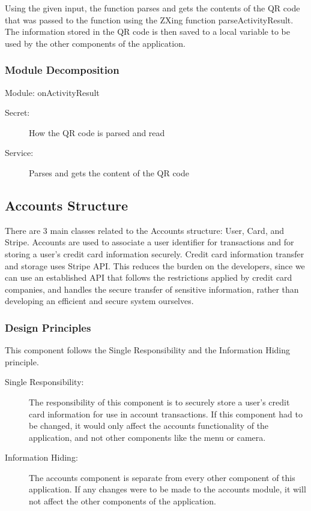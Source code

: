 \documentclass[12pt, titlepage]{article}
\begin{document}
Using the given input, the function parses and gets the contents of the QR code that was passed to the function using the ZXing function parseActivityResult. The information stored in the QR code is then saved to a local variable to be used by the other components of the application.

\subsubsection{Module Decomposition}

Module: onActivityResult
\begin{description}
	\item[Secret:]How the QR code is parsed and read
	\item[Service:] Parses and gets the content of the QR code
\end{description}

\subsection{Accounts Structure}
There are 3 main classes related to the Accounts structure: User, Card, and Stripe. Accounts are used to associate a user identifier for transactions and for storing a user's credit card information securely. Credit card information transfer and storage uses Stripe API. This reduces the burden on the developers, since we can use an established API that follows the restrictions applied by credit card companies, and handles the secure transfer of sensitive information, rather than developing an efficient and secure system ourselves.

\subsubsection{Design Principles}
This component follows the Single Responsibility and the Information Hiding principle.  

\begin{description}
	\item[Single Responsibility:] The responsibility of this component is to securely store a user's credit card information for use in account transactions. If this component had to be changed, it would only affect the accounts functionality of the application, and not other components like the menu or camera.
	\item[Information Hiding:] The accounts component is separate from every other component of this application. If any changes were to be made to the accounts module, it will not affect the other components of the application.
\end{description}
\end{document}
